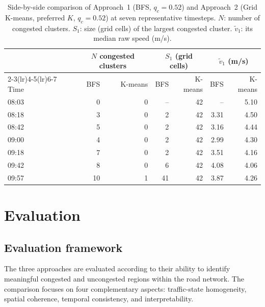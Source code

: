 \documentclass[11pt,a4paper]{article}
\begin{document}
\begin{table}[H]
  \centering
  \small
  \caption{Side-by-side comparison of Approach~1 (BFS, $q_c = 0.52$) and
    Approach~2 (Grid K-means, preferred $K$, $q_c = 0.52$) at seven
    representative timesteps.  $N$: number of congested clusters.  $S_1$: size
    (grid cells) of the largest congested cluster.  $\tilde{v}_1$: its median
    raw speed (m/s).}
  \label{tab:comparison}
  \setlength{\tabcolsep}{5pt}
  \begin{tabular}{l rr rr rr}
    \toprule
    & \multicolumn{2}{c}{$N$ congested clusters}
    & \multicolumn{2}{c}{$S_1$ (grid cells)}
    & \multicolumn{2}{c}{$\tilde{v}_1$ (m/s)} \\
    \cmidrule(lr){2-3}\cmidrule(lr){4-5}\cmidrule(lr){6-7}
    Time & BFS & K-means & BFS & K-means & BFS & K-means \\
    \midrule
    08:03 &  0 &  0 &  -- & 42 &  --   & 5.10 \\
    08:18 &  3 &  0 &   2 & 42 &  3.31 & 4.50 \\
    08:42 &  5 &  0 &   2 & 42 &  3.16 & 4.44 \\
    09:00 &  4 &  0 &   2 & 42 &  2.99 & 4.30 \\
    09:18 &  7 &  0 &   2 & 42 &  3.51 & 4.16 \\
    09:42 &  8 &  0 &   6 & 42 &  4.08 & 4.06 \\
    09:57 & 10 &  1 &  41 & 42 &  3.87 & 4.26 \\
    \bottomrule
  \end{tabular}
\end{table}

\section{Evaluation}
\label{sec:eval}

\subsection{Evaluation framework}
\label{sec:eval:framework}


The three approaches are evaluated according to their ability to identify
meaningful congested and uncongested regions within the road network. The
comparison focuses on four complementary aspects: traffic-state homogeneity,
spatial coherence, temporal consistency, and interpretability.
\end{document}
